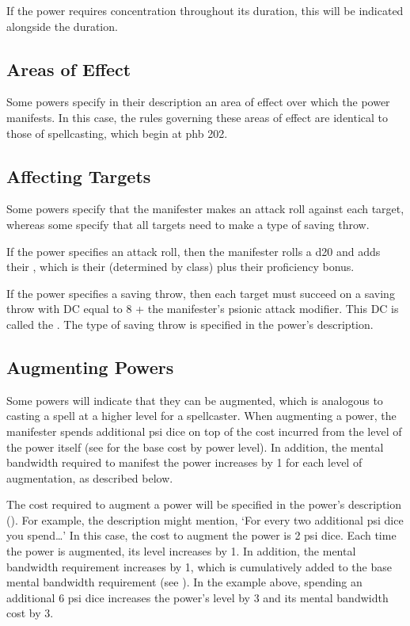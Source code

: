 If the power requires concentration throughout its duration,
this will be indicated alongside the duration.

\subsection{Areas of Effect}
\label{subs:area_of_effect}
Some powers specify in their description an area of effect
over which the power manifests.
In this case, the rules governing these areas of effect
are identical to those of spellcasting, which begin at
phb 202.

\subsection{Affecting Targets}
Some powers specify that the manifester makes an attack
roll against each target,
whereas some specify that all targets need to make
a type of saving throw.

If the power specifies an attack roll,
then the manifester rolls a d20
and adds their ,
which is their 
(determined by class)
plus their proficiency bonus.

If the power specifies a saving throw,
then each target must succeed on a saving throw
with DC equal to 8 + the manifester's psionic attack modifier.
This DC is called the .
The type of saving throw
is specified in the power's description.

\subsection{Augmenting Powers}
\label{sub:augmenting}
Some powers will indicate that they can be augmented,
which is analogous to casting a spell at a higher level for a spellcaster.
When augmenting a power,
the manifester spends additional psi dice on top of the cost
incurred from the level of the power itself
(see  for the base cost by power level).
In addition, the mental bandwidth required to manifest the power increases
by 1 for each level of augmentation, as described below.

The cost required to augment a power will be specified
in the power's description ().
For example, the description might mention,
`For every two additional psi dice you spend\dots'
In this case, the cost to augment the power is 2 psi dice.
Each time the power is augmented, its level increases by 1.
In addition, the mental bandwidth requirement increases by 1,
which is cumulatively added to the base mental bandwidth requirement
(see ).
In the example above,
spending an additional 6 psi dice increases the power's level by 3
and its mental bandwidth cost by 3.


